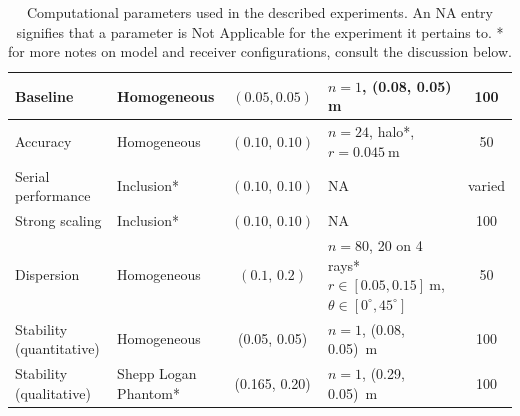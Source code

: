 \documentclass[final-report]{report-template}
\begin{document}
\begin{table}[!ht]
\begin{subtable}[!ht]{\textwidth}
\begin{tabular}{l p{} c m{} c
        }
            Baseline & 
            Homogeneous & 
            $(0.05, 0.05)$ & 
            $n=1$, (0.08, 0.05) \si{\metre}& 
            100 \\ \midrule

            Accuracy &
            Homogeneous &
            $(0.10,\,0.10)$ &
            $n=24$, halo*, \newline
            $r = \SI{0.045}{\metre}$ &
            50 \\ \midrule

            Serial performance & 
            Inclusion* &
            $(0.10,\,0.10)$ &
            NA &
            varied \\ \midrule

            Strong scaling & 
            Inclusion* & 
            $(0.10,\,0.10)$ & 
            NA & 
            100 \\ \midrule

            Dispersion & 
            Homogeneous & 
            $(0.1,\,0.2)$ & 
            $n=80$, 20 on 4 rays* 
            \newline $r \in [0.05, 0.15]\ \si{\metre}$, 
            \newline $\theta \in [0^{\circ}, 45^{\circ}]$ & 
            50 \\ \midrule

            Stability (quantitative) & 
            Homogeneous & 
            (0.05, 0.05) & 
            $n=1$, (0.08, 0.05)\ \si{\metre} & 
            100 \\ \midrule
            
            Stability (qualitative) & 
            Shepp Logan Phantom* & 
            (0.165, 0.20) & 
            $n=1$, (0.29, 0.05)\ \si{\metre} & 
            100 \\

            \bottomrule
        \end{tabular}
        \caption{Physical and acquisition parameters.}
        \label{tab:parameters_physical}
    \end{subtable}

    \caption{Computational parameters used in the described experiments. An NA entry signifies that a parameter is Not Applicable for the experiment it pertains to. * for more notes on model and receiver configurations, consult the discussion below.}
    \label{tab:parameters}
\end{table}
\end{document}
